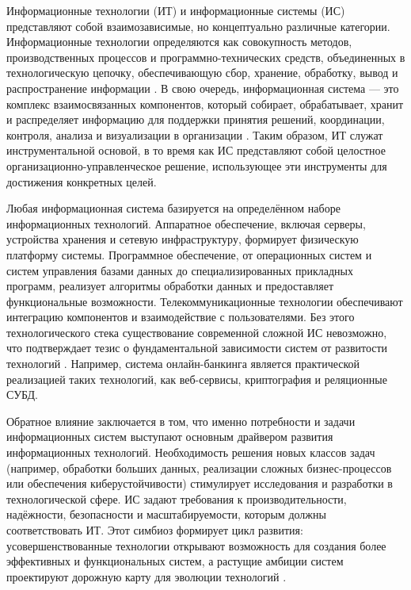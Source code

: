 \documentclass{SibFU-docs}
\begin{document}

Информационные технологии (ИТ) и информационные системы (ИС) представляют собой взаимозависимые, но концептуально различные категории. Информационные технологии определяются как совокупность методов, производственных процессов и программно-технических средств, объединенных в технологическую цепочку, обеспечивающую сбор, хранение, обработку, вывод и распространение информации \cite{it-foundation}. В свою очередь, информационная система — это комплекс взаимосвязанных компонентов, который собирает, обрабатывает, хранит и распределяет информацию для поддержки принятия решений, координации, контроля, анализа и визуализации в организации \cite{is-definition}. Таким образом, ИТ служат инструментальной основой, в то время как ИС представляют собой целостное организационно-управленческое решение, использующее эти инструменты для достижения конкретных целей.


Любая информационная система базируется на определённом наборе информационных технологий. Аппаратное обеспечение, включая серверы, устройства хранения и сетевую инфраструктуру, формирует физическую платформу системы. Программное обеспечение, от операционных систем и систем управления базами данных до специализированных прикладных программ, реализует алгоритмы обработки данных и предоставляет функциональные возможности. Телекоммуникационные технологии обеспечивают интеграцию компонентов и взаимодействие с пользователями. Без этого технологического стека существование современной сложной ИС невозможно, что подтверждает тезис о фундаментальной зависимости систем от развитости технологий \cite{systems-approach}. Например, система онлайн-банкинга является практической реализацией таких технологий, как веб-сервисы, криптография и реляционные СУБД.


Обратное влияние заключается в том, что именно потребности и задачи информационных систем выступают основным драйвером развития информационных технологий. Необходимость решения новых классов задач (например, обработки больших данных, реализации сложных бизнес-процессов или обеспечения киберустойчивости) стимулирует исследования и разработки в технологической сфере. ИС задают требования к производительности, надёжности, безопасности и масштабируемости, которым должны соответствовать ИТ. Этот симбиоз формирует цикл развития: усовершенствованные технологии открывают возможность для создания более эффективных и функциональных систем, а растущие амбиции систем проектируют дорожную карту для эволюции технологий \cite{systems-approach}.
\end{document}
